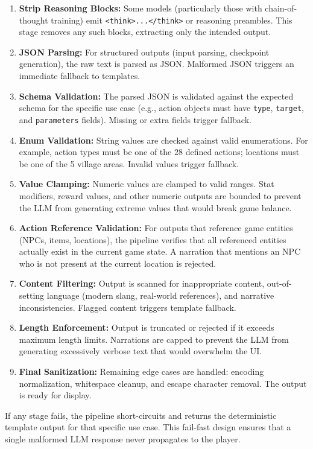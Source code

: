 \documentclass[12pt, a4paper, oneside]{report}
\begin{document}
\begin{enumerate}[nosep]
    \item \textbf{Strip Reasoning Blocks:} Some models (particularly those with chain-of-thought training) emit \texttt{<think>...</think>} or reasoning preambles. This stage removes any such blocks, extracting only the intended output.
    \item \textbf{JSON Parsing:} For structured outputs (input parsing, checkpoint generation), the raw text is parsed as JSON. Malformed JSON triggers an immediate fallback to templates.
    \item \textbf{Schema Validation:} The parsed JSON is validated against the expected schema for the specific use case (e.g., action objects must have \texttt{type}, \texttt{target}, and \texttt{parameters} fields). Missing or extra fields trigger fallback.
    \item \textbf{Enum Validation:} String values are checked against valid enumerations. For example, action types must be one of the 28 defined actions; locations must be one of the 5 village areas. Invalid values trigger fallback.
    \item \textbf{Value Clamping:} Numeric values are clamped to valid ranges. Stat modifiers, reward values, and other numeric outputs are bounded to prevent the LLM from generating extreme values that would break game balance.
    \item \textbf{Action Reference Validation:} For outputs that reference game entities (NPCs, items, locations), the pipeline verifies that all referenced entities actually exist in the current game state. A narration that mentions an NPC who is not present at the current location is rejected.
    \item \textbf{Content Filtering:} Output is scanned for inappropriate content, out-of-setting language (modern slang, real-world references), and narrative inconsistencies. Flagged content triggers template fallback.
    \item \textbf{Length Enforcement:} Output is truncated or rejected if it exceeds maximum length limits. Narrations are capped to prevent the LLM from generating excessively verbose text that would overwhelm the UI.
    \item \textbf{Final Sanitization:} Remaining edge cases are handled: encoding normalization, whitespace cleanup, and escape character removal. The output is ready for display.
\end{enumerate}

If any stage fails, the pipeline short-circuits and returns the deterministic template output for that specific use case. This fail-fast design ensures that a single malformed LLM response never propagates to the player.
\end{document}
